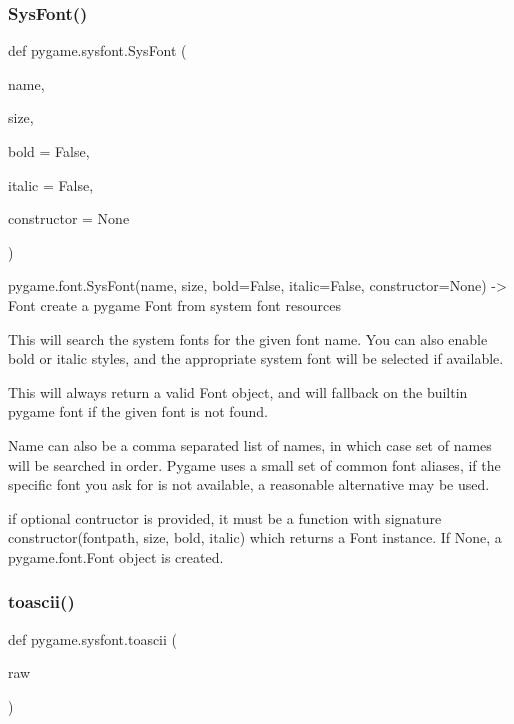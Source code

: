 \subsubsection{\texorpdfstring{Sys\+Font()}{SysFont()}}
{\footnotesize\ttfamily def pygame.\+sysfont.\+Sys\+Font (\begin{DoxyParamCaption}\item[{}]{name,  }\item[{}]{size,  }\item[{}]{bold = {\ttfamily False},  }\item[{}]{italic = {\ttfamily False},  }\item[{}]{constructor = {\ttfamily None} }\end{DoxyParamCaption})}

\begin{DoxyVerb}pygame.font.SysFont(name, size, bold=False, italic=False, constructor=None) -> Font
   create a pygame Font from system font resources

   This will search the system fonts for the given font
   name. You can also enable bold or italic styles, and
   the appropriate system font will be selected if available.

   This will always return a valid Font object, and will
   fallback on the builtin pygame font if the given font
   is not found.

   Name can also be a comma separated list of names, in
   which case set of names will be searched in order. Pygame
   uses a small set of common font aliases, if the specific
   font you ask for is not available, a reasonable alternative
   may be used.

   if optional contructor is provided, it must be a function with
   signature constructor(fontpath, size, bold, italic) which returns
   a Font instance. If None, a pygame.font.Font object is created.
\end{DoxyVerb}
 \mbox{\label{namespacepygame_1_1sysfont_acdfcec8414fe9aefb7cda01ac296a90d}} 
\subsubsection{\texorpdfstring{toascii()}{toascii()}}
{\footnotesize\ttfamily def pygame.\+sysfont.\+toascii (\begin{DoxyParamCaption}\item[{}]{raw }\end{DoxyParamCaption})}


